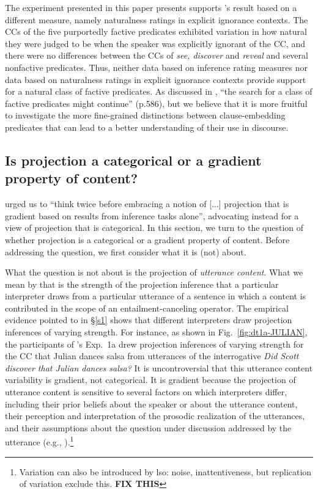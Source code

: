 \documentclass[11pt,fleqn]{article}
\newcommand{\6}{\mbox{$[\hspace*{-.6mm}[$}}
\newcommand{\9}{\mbox{$]\hspace*{-.6mm}]$}}
\newcommand{\citepos}[1]{\citeauthor{#1}'s \citeyear{#1}}
\begin{document}
The experiment presented in this paper presents supports \citepos{degen-tonhauser-language} result based on a different measure, namely naturalness ratings in explicit ignorance contexts. The CCs of the five purportedly factive predicates exhibited variation in how natural they were judged to be when the speaker was explicitly ignorant of the CC, and there were no differences between the CCs of {\em see, discover} and {\em reveal} and several nonfactive predicates. Thus, neither data based on inference rating measures nor data based on naturalness ratings in explicit ignorance contexts provide support for a natural class of factive predicates. As discussed in \citealt{degen-tonhauser-language}, ``the search for a class of factive predicates might continue'' (p.586), but we believe that it is more fruitful to investigate the more fine-grained distinctions between clause-embedding predicates that can lead to a better understanding of their use in discourse. 

\subsection{Is projection a categorical or a gradient property of content?}

\citealt[497]{mandelkern-etal2020} urged us to ``think twice before embracing a notion of [...] projection that is gradient based on results from inference tasks alone'', advocating instead for a view of projection that is categorical. In this section, we turn to the question of whether projection is a categorical or a gradient property of content. Before addressing the question, we first consider what it is (not) about.

What the question is not about is the projection of {\em utterance content}. What we mean by that is the strength of the projection inference that a particular interpreter draws from a particular utterance of a sentence in which a content is contributed in the scope of an entailment-canceling operator. The empirical evidence pointed to in \S\ref{s1} shows that different interpreters draw projection inferences of varying strength. For instance, as shown in Fig.~\ref{fig:dt1a-JULIAN}, the participants of \citepos{degen-tonhauser-language} Exp.~1a drew projection inferences of varying strength for the CC that Julian dances salsa from utterances of the interrogative {\em Did Scott discover that Julian dances salsa?} It is uncontroversial that this utterance content variability is gradient, not categorical. It is gradient because the projection of utterance content is sensitive to several factors on which interpreters differ, including their prior beliefs about the speaker or about the utterance content, their perception and interpretation of the prosodic realization of the utterances, and their assumptions about the question under discussion addressed by the utterance (e.g., \citealt{djaerv-bacovcin2020,degen-tonhauser-openmind,mahler2020,mahler-thesis,tonhauser-salt26,tbd-variability,tonhauser-etal-sub23}).\footnote{Variation can also be introduced by lso: noise, inattentiveness, but replication of variation exclude this. {\bf FIX THIS}} 
\end{document}
